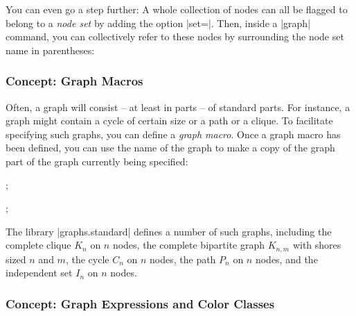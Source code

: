 \begin{codeexample}[]
\end{codeexample}

You can even go a step further: A whole collection of nodes can all be
flagged to belong to a \emph{node set} by adding the option
|set=|. Then, inside a |graph| command, you can
collectively refer to these nodes by surrounding the node set name in
parentheses: 

\begin{codeexample}[]
\end{codeexample}


\subsubsection{Concept: Graph Macros}

Often, a graph will consist -- at least in parts -- of standard
parts. For instance, a graph might contain a cycle of certain size or
a path or a clique. To facilitate specifying such graphs, you can
define a \emph{graph macro}. Once a graph macro has been defined, you
can use the name of the graph to make a copy of the graph part of the
graph currently being specified:

\begin{codeexample}[]
\tikz {};
\end{codeexample}

\begin{codeexample}[]
\tikz {};
\end{codeexample}

The library |graphs.standard| defines a number of such graphs,
including the complete clique $K_n$ on $n$ nodes, the complete
bipartite graph $K_{n,m}$ with shores sized $n$ and $m$, the cycle
$C_n$ on $n$ nodes, the path $P_n$ on $n$ nodes, and the independent
set $I_n$ on $n$ nodes.


\subsubsection{Concept: Graph Expressions and Color Classes}

